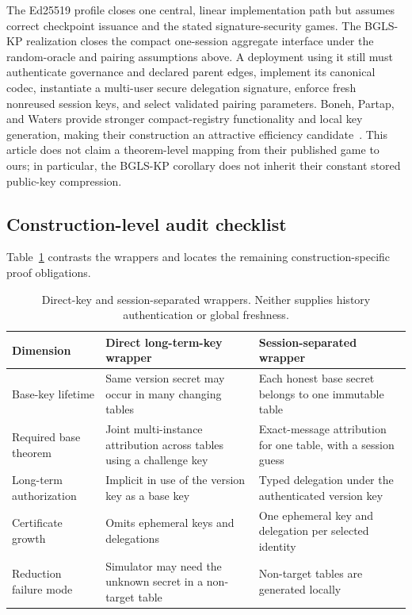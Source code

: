 \documentclass[11pt]{article}
\theoremstyle{definition}
\begin{document}
The Ed25519 profile closes one central, linear implementation path but assumes correct checkpoint issuance and the stated signature-security games.  The BGLS-KP realization closes the compact one-session aggregate interface under the random-oracle and pairing assumptions above.  A deployment using it still must authenticate governance and declared parent edges, implement its canonical codec, instantiate a multi-user secure delegation signature, enforce fresh nonreused session keys, and select validated pairing parameters.  Boneh, Partap, and Waters provide stronger compact-registry functionality and local key generation, making their construction an attractive efficiency candidate~\cite{boneh2025accountable}.  This article does not claim a theorem-level mapping from their published game to ours; in particular, the BGLS-KP corollary does not inherit their constant stored public-key compression.

\subsection{Construction-level audit checklist}\label{subsec:audit-checklist}
Table~\ref{tab:audit} contrasts the wrappers and locates the remaining construction-specific proof obligations.

\begin{table}[t]
\centering
\caption{Direct-key and session-separated wrappers.  Neither supplies history authentication or global freshness.}
\label{tab:audit}
\begin{tabularx}{\linewidth}{@{}>{\raggedright\arraybackslash}p{.21\linewidth}>{\raggedright\arraybackslash}X>{\raggedright\arraybackslash}X@{}}
\toprule
Dimension & Direct long-term-key wrapper & Session-separated wrapper\\
\midrule
Base-key lifetime & Same version secret may occur in many changing tables & Each honest base secret belongs to one immutable table\\
Required base theorem & Joint multi-instance attribution across tables using a challenge key & Exact-message attribution for one table, with a session guess\\
Long-term authorization & Implicit in use of the version key as a base key & Typed delegation under the authenticated version key\\
Certificate growth & Omits ephemeral keys and delegations & One ephemeral key and delegation per selected identity\\
Reduction failure mode & Simulator may need the unknown secret in a non-target table & Non-target tables are generated locally\\
\bottomrule
\end{tabularx}
\end{table}
\end{document}
